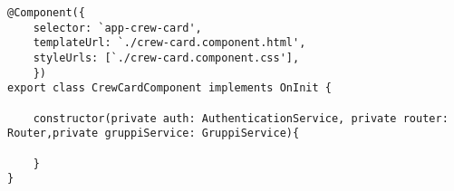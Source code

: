 \begin{lstlisting}[style= Java, caption = {Esempio di \textit{constructor injection}}]
@Component({
    selector: `app-crew-card',
    templateUrl: `./crew-card.component.html',
    styleUrls: [`./crew-card.component.css'],
    })
export class CrewCardComponent implements OnInit {

    constructor(private auth: AuthenticationService, private router: Router,private gruppiService: GruppiService){

    }
}
\end{lstlisting}